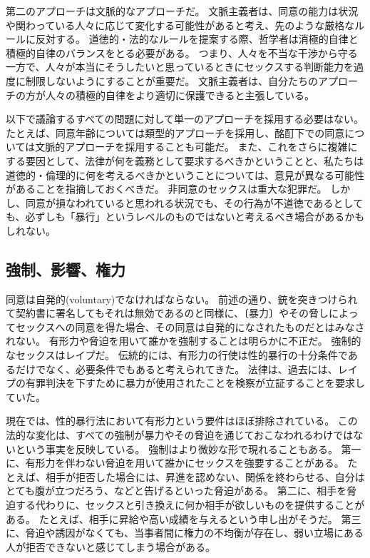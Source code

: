 \documentclass[paper=a4,book,openany]{jlreq}
\begin{document}
第二のアプローチは文脈的なアプローチだ。
文脈主義者は、同意の能力は状況や関わっている人々に応じて変化する可能性があると考え、先のような厳格なルールに反対する。
道徳的・法的なルールを提案する際、哲学者は消極的自律と積極的自律のバランスをとる必要がある。
つまり、人々を不当な干渉から守る一方で、人々が本当にそうしたいと思っているときにセックスする判断能力を過度に制限しないようにすることが重要だ。
文脈主義者は、自分たちのアプローチの方が人々の積極的自律をより適切に保護できると主張している。

以下で議論するすべての問題に対して単一のアプローチを採用する必要はない。
たとえば、同意年齢については類型的アプローチを採用し、酩酊下での同意については文脈的アプローチを採用することも可能だ。
また、これをさらに複雑にする要因として、法律が何を義務として要求するべきかということと、私たちは道徳的・倫理的に何を考えるべきかということについては、意見が異なる可能性があることを指摘しておくべきだ。
非同意のセックスは重大な犯罪だ。
しかし、同意が損なわれていると思われる状況でも、その行為が不道徳であるとしても、必ずしも「暴行」というレベルのものではないと考えるべき場合があるかもしれない。

\subsection{強制、影響、権力}

同意は自発的(voluntary)でなければならない。
前述の通り、銃を突きつけられて契約書に署名してもそれは無効であるのと同様に、〔暴力〕やその脅しによってセックスへの同意を得た場合、その同意は自発的になされたものだとはみなされない。
有形力や脅迫を用いて誰かを強制することは明らかに不正だ。
強制的なセックスはレイプだ。
伝統的には、有形力の行使は性的暴行の十分条件であるだけでなく、必要条件でもあると考えられてきた。
法律は、過去には、レイプの有罪判決を下すために暴力が使用されたことを検察が立証することを要求していた。

現在では、性的暴行法において有形力という要件はほぼ排除されている。
この法的な変化は、すべての強制が暴力やその脅迫を通じておこなわれるわけではないという事実を反映している。
強制はより微妙な形で現れることもある。
第一に、有形力を伴わない脅迫を用いて誰かにセックスを強要することがある。
たとえば、相手が拒否した場合には、昇進を認めない、関係を終わらせる、自分はとても腹が立つだろう、などと告げるといった脅迫がある。
第二に、相手を脅迫する代わりに、セックスと引き換えに何か相手が欲しいものを提供することがある。
たとえば、相手に昇給や高い成績を与えるという申し出がそうだ。
第三に、脅迫や誘因がなくても、当事者間に権力の不均衡が存在し、弱い立場にある人が拒否できないと感じてしまう場合がある。
\end{document}
